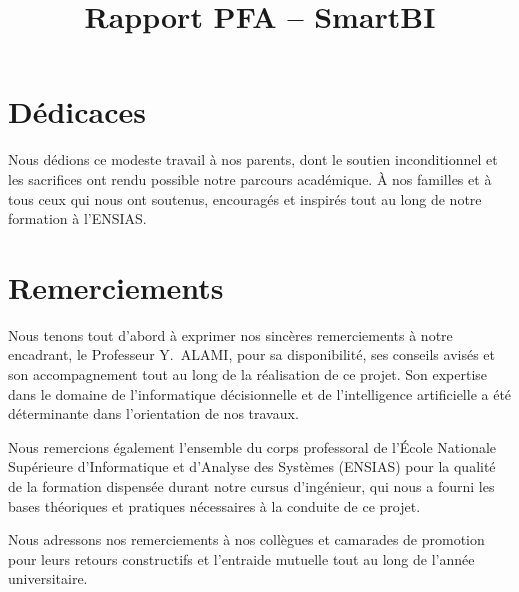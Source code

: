 \documentclass{rapportENSIAS}
\title{Rapport PFA -- SmartBI}
\begin{document}






\fairemarges
\fairepagedegarde
\chapter*{Dédicaces}

Nous dédions ce modeste travail à nos parents, dont le soutien inconditionnel et les sacrifices ont rendu possible notre parcours académique. À nos familles et à tous ceux qui nous ont soutenus, encouragés et inspirés tout au long de notre formation à l'ENSIAS.

\chapter*{Remerciements}

Nous tenons tout d'abord à exprimer nos sincères remerciements à notre encadrant, le Professeur Y.~ALAMI, pour sa disponibilité, ses conseils avisés et son accompagnement tout au long de la réalisation de ce projet. Son expertise dans le domaine de l'informatique décisionnelle et de l'intelligence artificielle a été déterminante dans l'orientation de nos travaux.

Nous remercions également l'ensemble du corps professoral de l'École Nationale Supérieure d'Informatique et d'Analyse des Systèmes (ENSIAS) pour la qualité de la formation dispensée durant notre cursus d'ingénieur, qui nous a fourni les bases théoriques et pratiques nécessaires à la conduite de ce projet.

Nous adressons nos remerciements à nos collègues et camarades de promotion pour leurs retours constructifs et l'entraide mutuelle tout au long de l'année universitaire.
\end{document}
